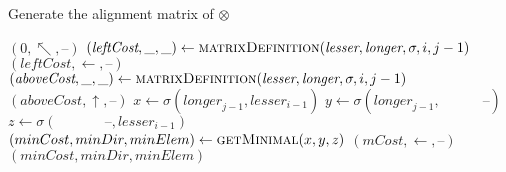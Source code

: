 \documentclass[11pt]{article}
\begin{document}
\begin{algorithm}
  \caption{Generate the alignment matrix of $\otimes$}\label{matrixDefinition}
  \begin{algorithmic}[1]
        \State \Return $\left( 0, \nwarrow, \textbf{--} \right)$
        \State $\left(\textit{leftCost}, \_, \_ \right) \gets \Call{matrixDefinition}{\textit{lesser}, \textit{longer}, \sigma, i, j - 1}$
        \State \Return $\left( \textit{leftCost}, \leftarrow, \textbf{--} \right)$ 
        \State $\left(\textit{aboveCost}, \_, \_ \right) \gets \Call{matrixDefinition}{\textit{lesser}, \textit{longer}, \sigma, i, j - 1}$
        \State \Return $\left( \textit{aboveCost}, \uparrow, \textbf{--} \right)$
      \Else
        \State $x \gets \sigma \left(           \textit{longer}_{j-1}, \textit{lesser}_{i-1} \right)$
        \State $y \gets \sigma \left(           \textit{longer}_{j-1}, \quad\quad\quad \textbf{--} \right)$
        \State $z \gets \sigma \left( \quad\quad\quad\;\, \textbf{--}, \textit{lesser}_{i-1} \right)$
        \State $\left( minCost, minDir, minElem \right) \gets \Call{getMinimal}{x, y, z}$
          \State \Return $\left( mCost, \leftarrow, \textbf{--} \right)$
        \Else 
          \State \Return $\left( minCost, minDir, minElem \right)$
        \EndIf
      \EndIf
    \EndFunction  
  \end{algorithmic}
\end{algorithm}
\end{document}
